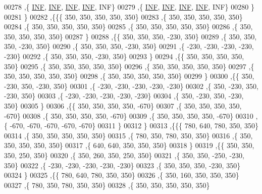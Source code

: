 \begin{DoxyCode}
00278    ,\{   \hyperlink{constants_8h_a12c2040f25d8e3a7b9e1c2024c618cb6}{INF},   \hyperlink{constants_8h_a12c2040f25d8e3a7b9e1c2024c618cb6}{INF},   \hyperlink{constants_8h_a12c2040f25d8e3a7b9e1c2024c618cb6}{INF},   \hyperlink{constants_8h_a12c2040f25d8e3a7b9e1c2024c618cb6}{INF},   INF\}
00279    ,\{   \hyperlink{constants_8h_a12c2040f25d8e3a7b9e1c2024c618cb6}{INF},   \hyperlink{constants_8h_a12c2040f25d8e3a7b9e1c2024c618cb6}{INF},   \hyperlink{constants_8h_a12c2040f25d8e3a7b9e1c2024c618cb6}{INF},   \hyperlink{constants_8h_a12c2040f25d8e3a7b9e1c2024c618cb6}{INF},   INF\}
00280    \}
00281   \}
00282  ,\{\{\{   350,   350,   350,   350,   350\}
00283    ,\{   350,   350,   350,   350,   350\}
00284    ,\{   350,   350,   350,   350,   350\}
00285    ,\{   350,   350,   350,   350,   350\}
00286    ,\{   350,   350,   350,   350,   350\}
00287    \}
00288   ,\{\{   350,   350,   350,  -230,   350\}
00289    ,\{   350,   350,   350,  -230,   350\}
00290    ,\{   350,   350,   350,  -230,   350\}
00291    ,\{  -230,  -230,  -230,  -230,  -230\}
00292    ,\{   350,   350,   350,  -230,   350\}
00293    \}
00294   ,\{\{   350,   350,   350,   350,   350\}
00295    ,\{   350,   350,   350,   350,   350\}
00296    ,\{   350,   350,   350,   350,   350\}
00297    ,\{   350,   350,   350,   350,   350\}
00298    ,\{   350,   350,   350,   350,   350\}
00299    \}
00300   ,\{\{   350,  -230,   350,  -230,   350\}
00301    ,\{  -230,  -230,  -230,  -230,  -230\}
00302    ,\{   350,  -230,   350,  -230,   350\}
00303    ,\{  -230,  -230,  -230,  -230,  -230\}
00304    ,\{   350,  -230,   350,  -230,   350\}
00305    \}
00306   ,\{\{   350,   350,   350,   350,  -670\}
00307    ,\{   350,   350,   350,   350,  -670\}
00308    ,\{   350,   350,   350,   350,  -670\}
00309    ,\{   350,   350,   350,   350,  -670\}
00310    ,\{  -670,  -670,  -670,  -670,  -670\}
00311    \}
00312   \}
00313  ,\{\{\{   780,   640,   780,   350,   350\}
00314    ,\{   350,   350,   350,   350,   350\}
00315    ,\{   780,   350,   780,   350,   350\}
00316    ,\{   350,   350,   350,   350,   350\}
00317    ,\{   640,   640,   350,   350,   350\}
00318    \}
00319   ,\{\{   350,   350,   350,   250,   350\}
00320    ,\{   350,   260,   350,   250,   350\}
00321    ,\{   350,   350,  -250,  -230,   350\}
00322    ,\{  -230,  -230,  -230,  -230,  -230\}
00323    ,\{   350,   350,   350,  -230,   350\}
00324    \}
00325   ,\{\{   780,   640,   780,   350,   350\}
00326    ,\{   350,   160,   350,   350,   350\}
00327    ,\{   780,   350,   780,   350,   350\}
00328    ,\{   350,   350,   350,   350,   350\}

\end{DoxyCode}
